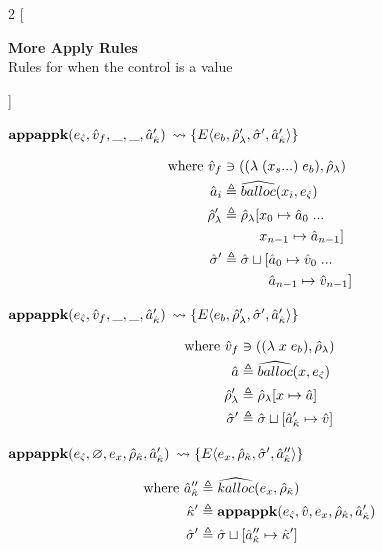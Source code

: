 \documentclass[12pt,draft]{article}
\newcommand{\lamsyn}[2]{(\lambda\;(#1 ...)\;#2)}
\newcommand{\vararglamsyn}[2]{(\lambda\;#1\;#2)}
\begin{document}
\begin{multicols*}{2}
[
\begin{center}
\textbf{More Apply Rules} \\
Rules for when the control is a value
\end{center}
]
\begin{center}
  $\textbf{appappk}(e_{\hat{\varsigma}}, \hat{v}_f , \_, \_ , \hat{a}_{\hat{\kappa}}')$
  $\leadsto \{E\langle e_b , \hat{\rho}_{\lambda}' , \hat{\sigma}' , \hat{a}_{\hat{\kappa}}' \rangle\}$
\end{center}
\vspace{-7mm}
\begin{align*}
  \text{where }
  \aval_f &\ni (\lamsyn{x_s}{e_b} , \aenv_{\lambda}) \\
  \abaddr_i &\triangleq \aballoc{x_i , \ectrl} \\
  \aenv_{\lambda}' &\triangleq \aenv_{\lambda}[x_0 \mapsto \abaddr_0\;... \\
                        &\;\;\;\;\;\;\;\;\;\,x_{n-1} \mapsto \abaddr_{n-1}] \\
  \astore' &\triangleq \astore \sqcup [\abaddr_0 \mapsto \aval_0\;... \\
                        &\;\;\;\;\;\;\;\;\;\;\;\;\abaddr_{n-1} \mapsto \aval_{n-1}]
\end{align*}
\begin{center}
  $\textbf{appappk}(e_{\hat{\varsigma}}, \hat{v}_f, \_, \_, \hat{a}_{\hat{\kappa}}')$
  $\leadsto \{E\langle e_b , \hat{\rho}_{\lambda}' , \hat{\sigma}' , \hat{a}_{\hat{\kappa}}' \rangle\}$
\end{center}
\vspace{-7mm}
\begin{align*}
  \text{where }
  \aval_f &\ni (\vararglamsyn{x}{e_b} , \aenv_{\lambda}) \\
  \abaddr &\triangleq \aballoc{x , \ectrl} \\
  \aenv_{\lambda}' &\triangleq \aenv_{\lambda}[x \mapsto \abaddr] \\
  \astore' &\triangleq \astore \sqcup [\akaddr' \mapsto \aval]
\end{align*}
\begin{center}
  $\textbf{appappk}(e_{\hat{\varsigma}}, \varnothing , e_x , \hat{\rho}_{\hat{\kappa}} , \hat{a}_{\hat{\kappa}}')$
  $\leadsto \{E\langle e_x , \hat{\rho}_{\hat{\kappa}} , \hat{\sigma}' , \hat{a}_{\hat{\kappa}}'' \rangle\}$
\end{center}
\vspace{-7mm}
\begin{align*}
  \text{where }
  \hat{a}_{\hat{\kappa}}'' &\triangleq \widehat{kalloc}(e_x , \hat{\rho}_{\hat{\kappa}}) \\
  \hat{\kappa}' &\triangleq \textbf{appappk}(e_{\hat{\varsigma}},\hat{v},e_x,\hat{\rho}_{\hat{\kappa}},\hat{a}_{\hat{\kappa}}') \\
  \hat{\sigma}' &\triangleq \hat{\sigma} \sqcup [\hat{a}_{\hat{\kappa}}'' \mapsto \hat{\kappa}']
\end{align*}


\end{multicols*}
\end{document}
